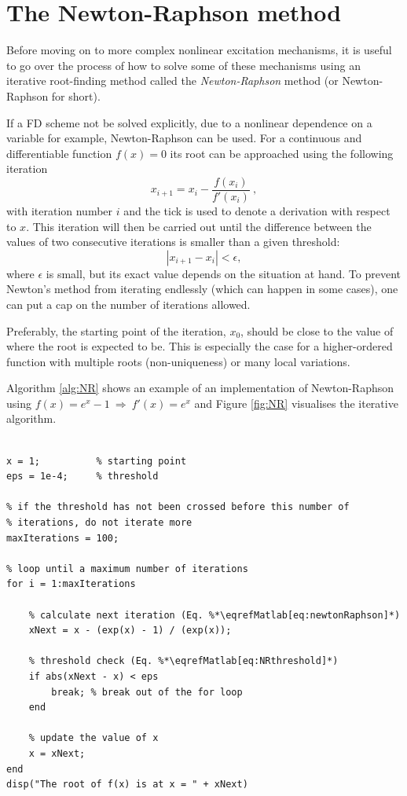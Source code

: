 \section{The Newton-Raphson method}\label{sec:newtonRaphson}
Before moving on to more complex nonlinear excitation mechanisms, it is useful to go over the process of how to solve some of these mechanisms using an iterative root-finding method called the \textit{Newton-Raphson} method (or Newton-Raphson for short). 

If a FD scheme not be solved explicitly, due to a nonlinear dependence on a variable for example, Newton-Raphson can be used. For a continuous and differentiable function $f(x) = 0$ its root can be approached using the following iteration
\begin{equation}\label{eq:newtonRaphson}
    x_{i+1} = x_i - \frac{f(x_i)}{f'(x_i)}\ ,
\end{equation}
with iteration number $i$ and the tick is used to denote a derivation with respect to $x$.
This iteration will then be carried out until the difference between the values of two consecutive iterations is smaller than a given threshold:
\begin{equation}\label{eq:NRthreshold}
    |x_{i+1} - x_i| < \epsilon,
\end{equation} 
where $\epsilon$ is small, but its exact value depends on the situation at hand. To prevent Newton's method from iterating endlessly (which can happen in some cases), one can put a cap on the number of iterations allowed. 

Preferably, the starting point of the iteration, $x_0$, should be close to the value of where the root is expected to be. This is especially the case for a higher-ordered function with multiple roots (non-uniqueness) or many local variations. 

Algorithm \ref{alg:NR} shows an example of an implementation of Newton-Raphson using $f(x) = e^x -1\ \Rightarrow\ f'(x) = e^x $ and Figure \ref{fig:NR} visualises the iterative algorithm.
\\
\setlstMAT
\begin{lstlisting}[caption={Example of an implementation of the Newton-Raphson method using $f(x) = e^{x} - 1$.}, label=alg:NR]
% An example of the Newton Raphson method using f(x) = exp(x) - 1

x = 1;          % starting point
eps = 1e-4;     % threshold

% if the threshold has not been crossed before this number of 
% iterations, do not iterate more
maxIterations = 100;    
    
% loop until a maximum number of iterations
for i = 1:maxIterations

    % calculate next iteration (Eq. %*\eqrefMatlab[eq:newtonRaphson]*)
    xNext = x - (exp(x) - 1) / (exp(x));

    % threshold check (Eq. %*\eqrefMatlab[eq:NRthreshold]*)
    if abs(xNext - x) < eps 
        break; % break out of the for loop
    end

    % update the value of x
    x = xNext;
end
disp("The root of f(x) is at x = " + xNext)
\end{lstlisting}

